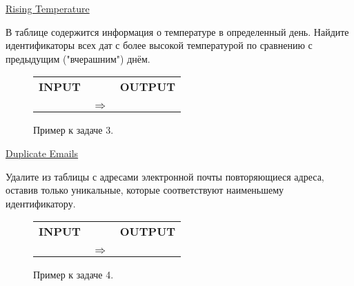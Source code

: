 \documentclass[10pt,fleqn]{article}
\newcounter{example}
\begin{document}
\begin{section}{\href{https://leetcode.com/problems/rising-temperature/}{Rising Temperature}}

В таблице содержится информация о температуре в определенный день. Найдите идентификаторы всех дат с более высокой температурой по сравнению с предыдущим ("вчерашним") днём.

\begin{figure}[!h]
    \centering
    \begin{tabular}{ccc}
        \textbf{INPUT} & & \textbf{OUTPUT} \\
        & & \\
         & $\Longrightarrow$ &  \\
     \end{tabular}
     \caption{Пример к задаче 3. \label{fig:task_03}}
\end{figure}

\end{section}

\newpage

\begin{section}{\href{https://leetcode.com/problems/duplicate-emails/}{Duplicate Emails}}

Удалите из таблицы с адресами электронной почты повторяющиеся адреса, оставив только уникальные, которые соответствуют наименьшему идентификатору.

    \begin{figure}[!h]
        \centering
        \begin{tabular}{ccc}
            \textbf{INPUT} & & \textbf{OUTPUT} \\
            & & \\
             & $\Longrightarrow$ &  \\
         \end{tabular}
         \caption{Пример к задаче 4. \label{fig:task_04}}
    \end{figure}

\end{section}
\end{document}
